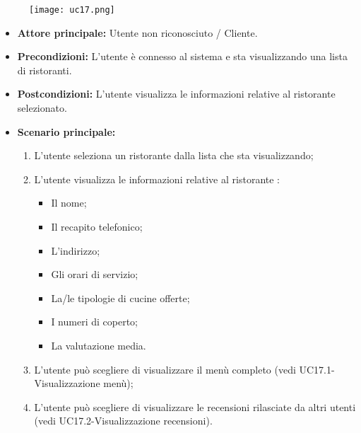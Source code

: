\begin{figure}[h] \texttt{[image: uc17.png]} \end{figure}
\begin{itemize}
\item \textbf{Attore principale:} Utente non riconosciuto / Cliente.
\item \textbf{Precondizioni:} L'utente è connesso al sistema e sta visualizzando una lista di ristoranti.
\item \textbf{Postcondizioni:} L'utente visualizza le informazioni relative al ristorante selezionato.
\item \textbf{Scenario principale:}
\begin{enumerate}
    \item L'utente seleziona un ristorante dalla lista che sta visualizzando;
    \item L'utente visualizza le informazioni relative al ristorante :
    \begin{itemize}
        \item Il nome;
        \item Il recapito telefonico;
        \item L'indirizzo;
        \item Gli orari di servizio;
        \item La/le tipologie di cucine offerte;
        \item I numeri di coperto;
        \item La valutazione media.
    \end{itemize}
    \item L'utente può scegliere di visualizzare il menù completo (vedi UC17.1-Visualizzazione menù);
    \item L'utente può scegliere di visualizzare le recensioni rilasciate da altri utenti (vedi UC17.2-Visualizzazione recensioni).
\end{enumerate}
\end{itemize}

